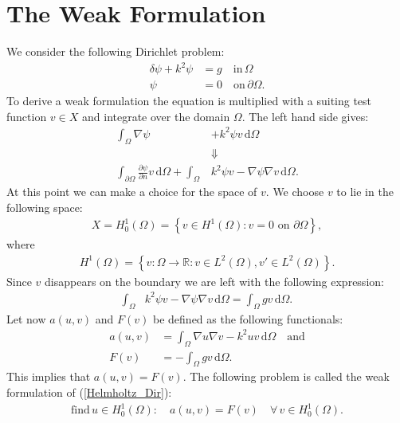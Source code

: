 \documentclass[10pt,a4paper]{article}
\begin{document}
\section*{The Weak Formulation}
We consider the following Dirichlet problem:
\begin{equation}
\begin{aligned}
\label{Helmholtz_Dir}
\delta \psi + k^2 \psi &= g  \quad \text{in} \, \Omega \\
\psi &= 0 \quad \text{on} \, \partial \Omega.
\end{aligned}
\end{equation}
To derive a weak formulation the equation is multiplied with a suiting test function $v \in X $ and integrate over the domain $\Omega$. The left hand side gives:
\begin{align*}
\int_\Omega \nabla \psi &+ k^2 \psi v \, \mathrm{d} \Omega \\
&\Downarrow \\
\int_{\partial \Omega} \frac{\partial \psi}{\partial n} v \, \mathrm{d} \Omega + \int_\Omega & k^2 \psi v - \nabla \psi \nabla v \, \mathrm{d} \Omega.
\end{align*}
At this point we can make a choice for the space of $v$. We choose $v$ to lie in the following space:
\begin{align*}
X = H^1_0(\Omega) = \left\{ v \in H^1(\Omega) : v = 0 \text{ on }   \partial \Omega \right\},
\end{align*}
where
\begin{align*}
H^1(\Omega) = \left\{ v: \Omega \rightarrow \mathbb{R}: v \in L^2(\Omega), v' \in L^2(\Omega) \right\}.
\end{align*}
Since $v$ disappears on the boundary we are left with the following expression:
\begin{align*}
\int_\Omega & k^2 \psi v - \nabla \psi \nabla v \, \mathrm{d} \Omega = \int_\Omega gv \, \mathrm{d} \Omega.
\end{align*}
Let now $a(u,v)$ and $F(v)$ be defined as the following functionals:
\begin{align*}
a(u,v) &= \int_\Omega  \nabla u \nabla v - k^2 u v  \, \mathrm{d} \Omega  \quad \text{and} \\
F(v) &= - \int_\Omega gv \, \mathrm{d} \Omega.
\end{align*}
This implies that $a(u,v) = F(v)$. The following problem is called the weak formulation of (\ref{Helmholtz_Dir}):
\begin{equation}
\begin{aligned}
\label{Helmholtz_weak}
\text{find} \, u \in H^1_0(\Omega): \quad a(u,v) = F(v) \quad \forall \, v \in H^1_0(\Omega).
\end{aligned}
\end{equation}
\end{document}
